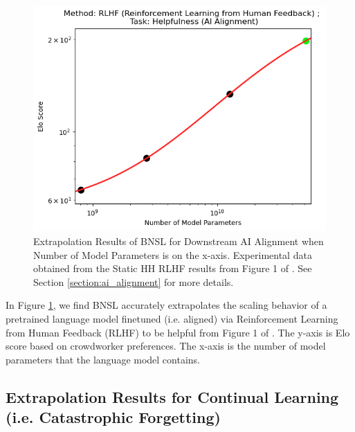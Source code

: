 \documentclass{article} %
\begin{document}
\begin{figure}[htbp]
    \centering
\includegraphics[width=1.0\textwidth]{figures/ai_alignment/log-log.png}
    \caption{
Extrapolation Results of BNSL for Downstream AI Alignment when Number of Model Parameters is on the x-axis. Experimental data obtained from the Static HH RLHF results from Figure 1 of \cite{bai2022training}. See Section \ref{section:ai_alignment} for more details.
    }
    \label{fig:ai_alignment}
\end{figure}

In Figure \ref{fig:ai_alignment}, we find BNSL accurately extrapolates the scaling behavior of a pretrained language model finetuned (i.e. aligned) via Reinforcement Learning from Human Feedback (RLHF) to be helpful from Figure 1 of \cite{bai2022training}. The y-axis is Elo score based on crowdworker preferences. The x-axis is the number of model parameters that the language model contains.

\vspace{5.0mm}

\clearpage

\subsection{Extrapolation Results for Continual Learning (i.e. Catastrophic Forgetting)}
\label{section:continual}
\end{document}
